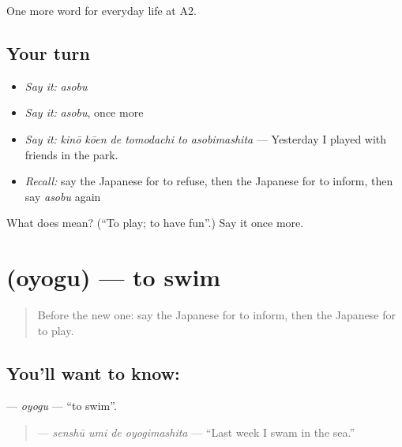 \begin{grammarlens}[title={What you've built}]
One more word for everyday life at A2.
\end{grammarlens}

\subsection*{Your turn}
\begin{itemize}
\raggedright
  \item \emph{Say it:} \emph{asobu}
  \item \emph{Say it:} \emph{asobu}, once more
  \item \emph{Say it:} \emph{kinō kōen de tomodachi to asobimashita} — Yesterday I played with friends in the park.
  \item \emph{Recall:} say the Japanese for to refuse, then the Japanese for to inform, then say \emph{asobu} again
\end{itemize}

\begin{tcolorbox}[breakable,colback=teal!4,colframe=teal!35!black,title={Before you move on}]
What does  mean? (\textquotedblleft{}To play; to have fun\textquotedblright{}.) Say it once more.
\end{tcolorbox}
\section[\texorpdfstring{\ja{およぐ} (oyogu)}{およぐ (oyogu)}]{ (oyogu) — to swim}

\label{lesson:JA-C233-oyogu}



\begin{quote}
Before the new one: say the Japanese for to inform, then the Japanese for to play.
\end{quote}

\subsection*{You'll want to know: }
\textbf{} — \emph{oyogu} — \textquotedblleft{}to swim\textquotedblright{}.

\begin{quote}
\textbf{  } — \emph{senshū umi de oyogimashita} — \textquotedblleft{}Last week I swam in the sea.\textquotedblright{}
\end{quote}

